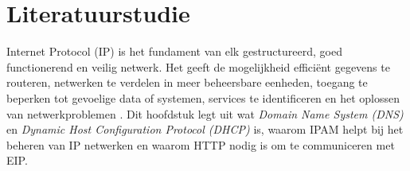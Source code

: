 \documentclass{hogent-article}
\begin{document}

\section{Literatuurstudie}
\label{sec:begrippen}
Internet Protocol (IP) is het fundament van elk gestructureerd, goed functionerend en veilig netwerk. Het geeft de mogelijkheid efficiënt gegevens te routeren, netwerken te verdelen in meer beheersbare eenheden, toegang te beperken tot gevoelige data of systemen, services te identificeren en het oplossen van netwerkproblemen \autocite{Postel1981}. Dit hoofdstuk legt uit wat \textit{Domain Name System (DNS)} en \textit{Dynamic Host Configuration Protocol (DHCP)} is, waarom IPAM helpt bij het beheren van IP netwerken en waarom HTTP nodig is om te communiceren met EIP. 
\end{document}
